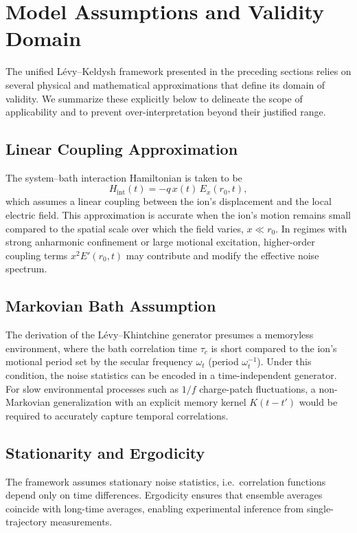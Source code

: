 \section{Model Assumptions and Validity Domain}
\label{sec:model_assumptions}

The unified L\'evy--Keldysh framework presented in the preceding sections relies on several
physical and mathematical approximations that define its domain of validity.
We summarize these explicitly below to delineate the scope of applicability
and to prevent over-interpretation beyond their justified range.

\subsection{Linear Coupling Approximation}
The system--bath interaction Hamiltonian is taken to be
\begin{equation}
H_\mathrm{int}(t) = -q\,x(t)\,E_x(r_0,t),
\end{equation}
which assumes a linear coupling between the ion's displacement and the local electric field.
This approximation is accurate when the ion's motion remains small compared to the spatial
scale over which the field varies, \(x \ll r_0\).  
In regimes with strong anharmonic confinement or large motional excitation,
higher-order coupling terms \(x^2 E'(r_0,t)\) may contribute and modify the effective noise spectrum.

\subsection{Markovian Bath Assumption}
The derivation of the Lévy–Khintchine generator presumes a memoryless environment,
where the bath correlation time \(\tau_c\) is short compared to the ion's motional period
set by the secular frequency \(\omega_t\) (period \(\omega_t^{-1}\)).
Under this condition, the noise statistics can be encoded in a time-independent generator.
For slow environmental processes such as \(1/f\) charge-patch fluctuations,
a non-Markovian generalization with an explicit memory kernel \(K(t-t')\)
would be required to accurately capture temporal correlations.

\subsection{Stationarity and Ergodicity}
The framework assumes stationary noise statistics,
i.e.\ correlation functions depend only on time differences.
Ergodicity ensures that ensemble averages coincide with long-time averages,
enabling experimental inference from single-trajectory measurements.

